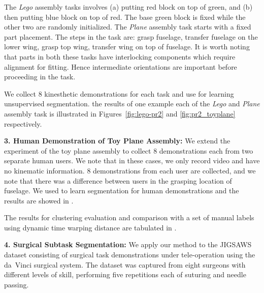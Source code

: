 \documentclass[0-main.tex]{subfiles}
\begin{document}
The \textit{Lego} assembly tasks involves (a) putting red block on top of green, and (b) then putting blue block on top of red. The base green block is fixed while the other two are randomly initialized. The \textit{Plane} assembly task starts with a fixed part placement. The steps in the task are: grasp fuselage, transfer fuselage on the lower wing, grasp top wing, transfer wing on top of fuselage. It is worth noting that parts in both these tasks have interlocking components which require alignment for fitting. Hence intermediate orientations are important before proceeding in the task. 

We collect 8 kinesthetic demonstrations for each task and use \TSC for learning unsupervised segmentation. the results of one example each of the \textit{Lego} and \textit{Plane} assembly task is illustrated in Figures~\ref{fig:lego-pr2} and \ref{fig:pr2_toyplane} respectively.

\vspace{5pt}
\noindent \textbf{3. Human Demonstration of Toy Plane Assembly: }
We extend the experiment of the toy plane assembly to collect 8 demonstrations each from two separate human users. We note that in these cases, we only record video and have no kinematic information. 8 demonstrations from each user are collected, and we note that there was a difference between users in the grasping location of fuselage. We used \TSC to learn segmentation for human demonstrations and the results are showed in .

The results for clustering evaluation and comparison with a set of manual labels using dynamic time warping distance are tabulated in .

\vspace{5pt}
\noindent \textbf{4. Surgical Subtask Segmentation: }
We apply our method to the JIGSAWS dataset\cite{gao2014jigsaws} consisting of surgical task demonstrations under tele-operation using the da~Vinci surgical system. The dataset was captured from eight surgeons with different levels of skill, performing five repetitions each of suturing and needle passing.
\end{document}
